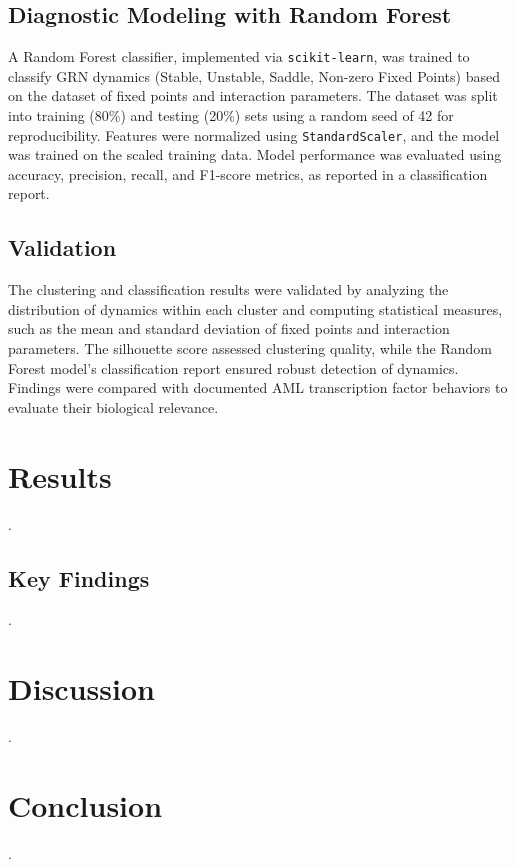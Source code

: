 \documentclass[a4paper,12pt]{article}
\begin{document}
\subsection{Diagnostic Modeling with Random Forest}
\label{subsec:diagnostic_modeling}
A Random Forest classifier, implemented via \texttt{scikit-learn}, was trained to classify GRN dynamics (Stable, Unstable, Saddle, Non-zero Fixed Points) based on the dataset of fixed points and interaction parameters. The dataset was split into training (80\%) and testing (20\%) sets using a random seed of 42 for reproducibility. Features were normalized using \texttt{StandardScaler}, and the model was trained on the scaled training data. Model performance was evaluated using accuracy, precision, recall, and F1-score metrics, as reported in a classification report.

\subsection{Validation}
\label{subsec:validation}
The clustering and classification results were validated by analyzing the distribution of dynamics within each cluster and computing statistical measures, such as the mean and standard deviation of fixed points and interaction parameters. The silhouette score assessed clustering quality, while the Random Forest model’s classification report ensured robust detection of dynamics. Findings were compared with documented AML transcription factor behaviors to evaluate their biological relevance.


\clearpage
\section{Results}
\label{sec:results}
.

\subsection{Key Findings}
.


\clearpage
\section{Discussion}
.

\clearpage
\section{Conclusion}
\label{sec:conclusion}
.
\end{document}
